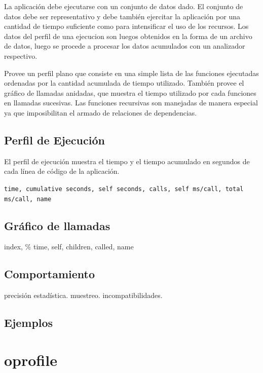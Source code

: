 \documentclass[a4paper]{report}
\begin{document}
\bigskip

La aplicaci\'on debe ejecutarse con un conjunto de datos dado. El conjunto de
datos debe ser representativo y debe tambi\'en ejercitar la aplicaci\'on por
una cantidad de tiempo suficiente como para intensificar el uso de los
recursos. Los datos del perfil de una ejecucion son luegos obtenidos en la
forma de un archivo de datos, luego se procede a procesar los datos acumulados
con un analizador respectivo.

\bigskip

Provee un perfil plano que consiste en una simple lista de las funciones
ejecutadas ordenadas por la cantidad acumulada de tiempo utilizado.
Tambi\'en provee el gr\'afico de llamadas anidadas, que muestra el tiempo
utilizado por cada funciones en llamadas sucesivas. Las funciones recursivas
son manejadas de manera especial ya que imposibilitan el armado de relaciones
de dependencias.

\subsection{Perfil de Ejecuci\'on}

El perfil de ejecuci\'on muestra el tiempo y el tiempo acumulado en segundos
de cada l\'inea de c\'odigo de la aplicaci\'on.

{\tt time, cumulative seconds, self seconds, calls, self ms/call,
  total ms/call, name}

\subsection{Gr\'afico de llamadas}

index, \% time, self, children, called, name

\subsection{Comportamiento}

precisi\'on estad\'istica. muestreo. incompatibilidades.

\subsection{Ejemplos}

\section{oprofile}
\end{document}
